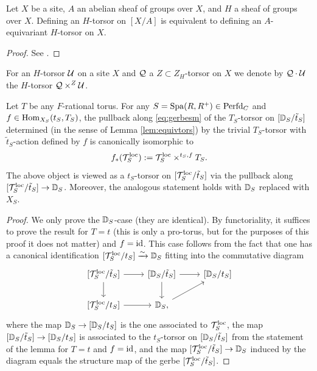 \begin{lem}\label{lem:equivtors} Let $X$ be a site, $A$ an abelian sheaf of groups over $X$, and $H$ a sheaf of groups over $X$. Defining an $H$-torsor on $[X/A]$ is equivalent to defining an $A$-equivariant $H$-torsor on $X$. 
\end{lem}

\begin{proof}
    See \cite[Remark 2.6]{Shin21}.
    \end{proof}

    For an $H$-torsor $\mathcal{U}$ on a site $X$ and $\mathcal{Q}$ a $Z \subset Z_{H}$-torsor on $X$ we denote by $\mathcal{Q} \cdot \mathcal{U}$ the $H$-torsor $\mathcal{Q} \times^{Z} \mathcal{U}$.

 \begin{lem}\label{lem:curlyT}
 Let $T$ be any $F$-rational torus. For any $S = \mathrm{Spa}(R,R^{+}) \in \mathrm{Perfd}_{C}$ and $f \in \mathrm{Hom}_{X_{S}}(t_{S}, T_{S})$, the pullback along \eqref{eq:gerbesm} of the $T_{S}$-torsor on $[\mathbb D_{S}/\tilde{t}_{S}]$ determined (in the sense of Lemma \ref{lem:equivtors}) by the trivial $T_{S}$-torsor with $\tilde{t}_{S}$-action defined by $f$ is canonically isomorphic to 
 \begin{equation*}
 f_{*}(\mathcal{T}_{S}^{\textnormal{loc}}) := \mathcal{T}_{S}^{\mathrm{loc}} \times^{t_{S},f} T_{S}.
 \end{equation*}
 The above object is viewed as a $t_{S}$-torsor on  $[\mathcal{T}_{S}^{\mathrm{loc}}/\tilde{t}_{S}]$ via the pullback along  $[\mathcal{T}_{S}^{\mathrm{loc}}/\tilde{t}_{S}] \to \mathbb D_{S}$. Moreover, the analogous statement holds with $\mathbb D_{S}$ replaced with $X_{S}$.
 \end{lem}

 \begin{proof}
     We only prove the $\mathbb D_{S}$-case (they are identical). By functoriality, it suffices to prove the result for $T = t$ (this is only a pro-torus, but for the purposes of this proof it does not matter) and $f = \textnormal{id}$. This case follows from the fact that one has a canonical identification $[\mathcal{T}_{S}^{\mathrm{loc}}/t_{S}] \xrightarrow{\sim} \mathbb D_{S}$ fitting into the commutative diagram
     \[
     \begin{tikzcd}
         \lb \mc{T}_{S}^{\loc}/\tilde{t}_{S} \rb \arrow{r} \arrow{d} & \lb \bbD_{S}/\tilde{t}_{S} \rb \arrow{d} \arrow{r} & \lb \bbD_{S}/t_{S} \rb \\
         \lb \mc{T}_{S}^{\loc}/t_{S} \rb \arrow{r} &\bbD_{S},\arrow{ru} & 
     \end{tikzcd}
     \]
     where the map $\mathbb D_{S} \to [ \mathbb D_{S}/t_{S} ]$ is the one associated to $\mathcal{T}_{S}^{\mathrm{loc}}$, the map $[ \mathbb D_{S}/\tilde{t}_{S} ] \to [ \mathbb D_{S}/t_{S} ]$ is associated to the $t_{S}$-torsor on $[ \mathbb D_{S}/\tilde{t}_{S} ]$ from the statement of the lemma for $T = t$ and $f = \textnormal{id}$, and the map $[\mathcal{T}_{S}^{\mathrm{loc}}/\tilde{t}_{S}] \to \mathbb D_{S}$ induced by the diagram equals the structure map of the gerbe $[\mathcal{T}_{S}^{\mathrm{loc}}/\tilde{t}_{S}]$.
 \end{proof}

